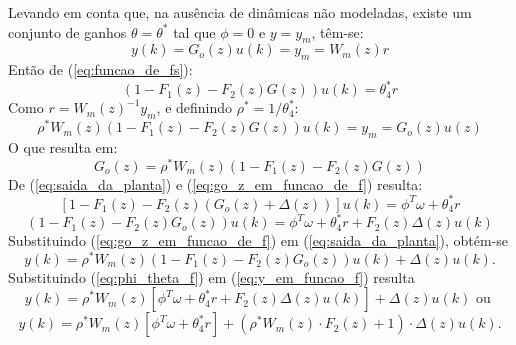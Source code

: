     Levando em conta que, na ausência de dinâmicas não modeladas, existe um conjunto de
    ganhos $\theta = \theta^*$ tal que $\phi = 0$ e $y = y_m$, têm-se:
    \begin{equation}
        y(k) = G_o(z) u(k) = y_m = W_m(z) r
    \end{equation}
    Então de (\ref{eq:funcao_de_fs}):
    \begin{equation}
        \left( 1 - F_1(z) - F_2(z) G(z) \right) u(k) = \theta_4^* r
    \end{equation}
    Como $r = W_m(z)^{-1} y_m$, e definindo $\rho^* = 1/\theta_4^*$:
    \begin{equation*}
        \rho^* W_m(z) \left( 1 - F_1(z) - F_2(z) G(z) \right) u(k) = y_m = G_o(z) u(z)
    \end{equation*}
    O que resulta em:
    \begin{equation}
        G_o(z) = \rho^* W_m(z) \left( 1 - F_1(z) - F_2(z) G(z) \right)
        \label{eq:go_z_em_funcao_de_f}
    \end{equation}
    De (\ref{eq:saida_da_planta}) e (\ref{eq:go_z_em_funcao_de_f}) resulta:
    \begin{equation*}
        \left[ 1 - F_1(z) - F_2(z) \left( G_o(z) + \Delta(z) \right) \right] u(k) =
            \phi^T \omega + \theta_4^* r
    \end{equation*}
    \begin{equation}
        \left( 1 - F_1(z) - F_2(z) G_o(z) \right) u(k) = \phi^T \omega + \theta_4^* r +
            F_2(z) \Delta(z) u(k)
        \label{eq:phi_theta_f}
    \end{equation}
    Substituindo (\ref{eq:go_z_em_funcao_de_f}) em (\ref{eq:saida_da_planta}), obtém-se
    \begin{equation}
        y(k) = \rho^* W_m(z) \left( 1 - F_1(z) - F_2(z) G_o(z) \right) u(k) + \Delta(z)
            u(k) \text{.}
        \label{eq:y_em_funcao_f}
    \end{equation}
    Substituindo (\ref{eq:phi_theta_f}) em (\ref{eq:y_em_funcao_f}) resulta
    \begin{equation*}
        y(k) = \rho^* W_m(z) \left[ \phi^T \omega + \theta_4^* r + F_2(z) \Delta(z) u(k) \right]
            + \Delta(z) u(k) \text{ ou }
    \end{equation*}
    \begin{equation*}
        y(k) = \rho^* W_m(z) \left[ \phi^T \omega + \theta_4^* r \right] + \left( \rho^* W_m(z)
            \cdot F_2(z) + 1 \right) \cdot \Delta(z) u(k) \text{.}
    \end{equation*}
